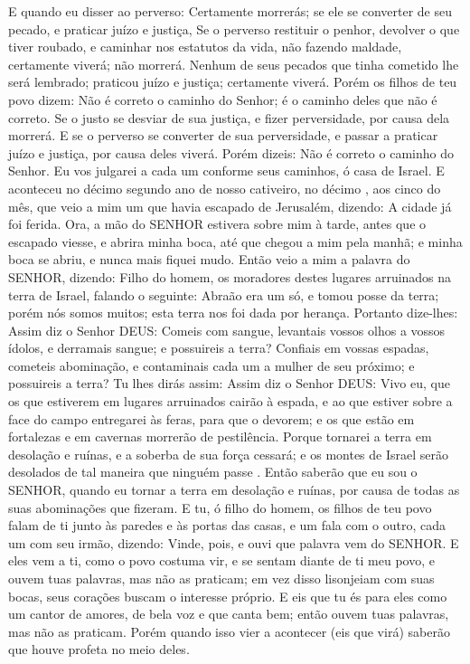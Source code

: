 {  E quando eu disser ao perverso: Certamente morrerás; se ele se converter de seu pecado, e praticar juízo e justiça,
  Se o perverso restituir o penhor, devolver o que tiver roubado, e caminhar nos estatutos da vida, não fazendo maldade, certamente viverá; não morrerá.
  Nenhum de seus pecados que tinha cometido lhe será lembrado; praticou juízo e justiça; certamente viverá.
  Porém os filhos de teu povo dizem: Não é correto o caminho do Senhor; é o caminho deles que não é correto.
  Se o justo se desviar de sua justiça, e fizer perversidade, por causa dela morrerá.
  E se o perverso se converter de sua perversidade, e passar a praticar juízo e justiça, por causa deles viverá.
  Porém dizeis: Não é correto o caminho do Senhor. Eu vos julgarei a cada um conforme seus
{} caminhos, ó casa de Israel.
  E aconteceu no décimo segundo ano de nosso cativeiro, no décimo
{},  aos cinco do mês, que veio a mim um que havia escapado de Jerusalém, dizendo: A cidade já foi ferida.
  Ora, a mão do SENHOR estivera sobre mim à tarde, antes que o escapado viesse, e abrira minha boca, até que chegou a mim pela manhã; e minha boca se abriu, e nunca mais fiquei mudo.
  Então veio a mim a palavra do SENHOR, dizendo:
  Filho do homem, os moradores destes lugares arruinados na terra de Israel, falando o seguinte: Abraão era um só, e tomou posse da terra; porém nós somos muitos; esta terra nos foi dada por herança.
  Portanto dize-lhes: Assim diz o Senhor DEUS: Comeis com sangue, levantais vossos olhos a vossos ídolos, e derramais sangue; e possuireis a terra?
  Confiais em vossas espadas, cometeis abominação, e contaminais cada um a mulher de seu próximo; e possuireis a terra?
  Tu lhes dirás assim: Assim diz o Senhor DEUS: Vivo eu, que os que estiverem em lugares arruinados cairão à espada, e ao que estiver sobre a face do campo entregarei às feras, para que o devorem; e os que estão em fortalezas e em cavernas morrerão de pestilência.
  Porque tornarei a terra em desolação e ruínas, e a soberba de sua força cessará; e os montes de Israel serão desolados de tal maneira que ninguém passe
{} .
  Então saberão que eu sou o SENHOR, quando eu tornar a terra em desolação e ruínas, por causa de todas as suas abominações que fizeram.
  E tu, ó filho do homem, os filhos de teu povo falam de ti junto às paredes e às portas das casas, e um fala com o outro, cada um com seu irmão, dizendo: Vinde, pois, e ouvi que palavra vem do SENHOR.
  E eles vem a ti, como o povo costuma vir, e se sentam diante de ti
{} meu povo, e ouvem tuas palavras, mas não as praticam; em vez disso lisonjeiam com suas bocas,
{} seus corações buscam o interesse próprio.
  E eis que tu és para eles como um cantor de amores, de bela voz e que canta bem; então ouvem tuas palavras, mas não as praticam.
  Porém quando isso vier a acontecer (eis que virá) saberão que houve profeta no meio deles.
\par }

